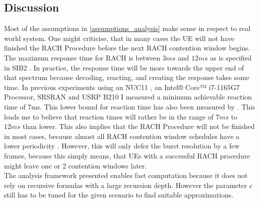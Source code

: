 \documentclass[conference]{IEEEtran}
\begin{document}
\subsection{Discussion}
Most of the assumptions in \ref{assumptions_analysis} make sense in respect to real world system.
One might criticise, that in many cases the UE will not have finished the RACH Procedure before the next RACH contention window begins.
The maximum response time for RACH is between $3ms$ and $12ms$ as is specified in SIB2 \cite{ETSI_TS_138_211}.
In practice, the response time will be more towards the upper end of that spectrum because decoding, reacting, and creating the response takes some time.
In previous experiments using an NUC11 \cite{NUC}, an Intel® Core™ i7-1165G7 Processor, SRSRAN \cite{srsRAN} and USRP B210 \cite{B210} I measured a minimum achievable reaction time of 7ms. This lower bound for reaction time has also been measured by \cite{Masterarbeit}.
This leads me to believe that reaction times will rather be in the range of $7ms$ to $12ms$ than lower.
This also implies that the RACH Procedure will not be finished in most cases, because almost all RACH contention window schedules have a lower periodicity \cite{ETSI_TS_138_211}.
However, this will only defer the burst resolution by a few frames, because this simply means, that UEs with a successful RACH procedure might leave one or 2 contention windows later.\\
The analysis framework presented enables fast computation because it does not rely on recursive formulas with a large recursion depth. However the parameter $c$ still has to be tuned for the given scenario to find suitable approximations.
\end{document}

